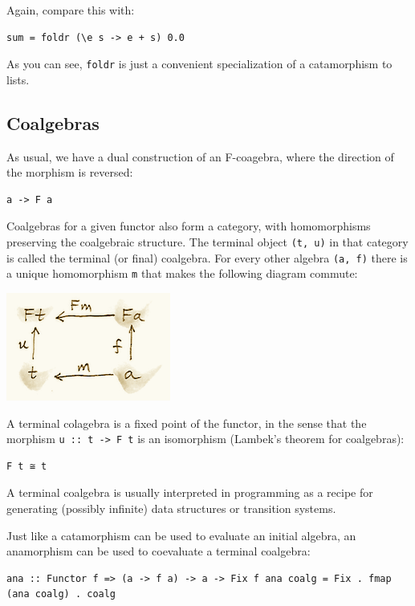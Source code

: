 Again, compare this with:

\begin{verbatim}
sum = foldr (\e s -> e + s) 0.0
\end{verbatim}

As you can see, \texttt{foldr} is just a convenient specialization of a
catamorphism to lists.

\subsection{Coalgebras}\label{coalgebras}

As usual, we have a dual construction of an F-coagebra, where the
direction of the morphism is reversed:

\begin{verbatim}
a -> F a
\end{verbatim}

Coalgebras for a given functor also form a category, with homomorphisms
preserving the coalgebraic structure. The terminal object
\texttt{(t,\ u)} in that category is called the terminal (or final)
coalgebra. For every other algebra \texttt{(a,\ f)} there is a unique
homomorphism \texttt{m} that makes the following diagram commute:

\includegraphics{images/alg7.png}

A terminal colagebra is a fixed point of the functor, in the sense that
the morphism \texttt{u\ ::\ t\ -\textgreater{}\ F\ t} is an isomorphism
(Lambek's theorem for coalgebras):

\begin{verbatim}
F t ≅ t
\end{verbatim}

A terminal coalgebra is usually interpreted in programming as a recipe
for generating (possibly infinite) data structures or transition
systems.

Just like a catamorphism can be used to evaluate an initial algebra, an
anamorphism can be used to coevaluate a terminal coalgebra:

\begin{verbatim}
ana :: Functor f => (a -> f a) -> a -> Fix f ana coalg = Fix . fmap (ana coalg) . coalg
\end{verbatim}

